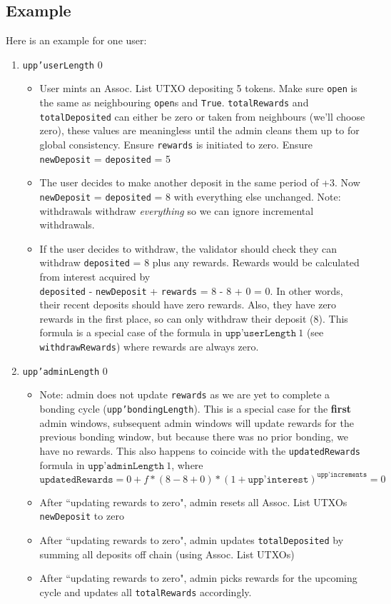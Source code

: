 \documentclass[10pt, a4paper]{article}
\theoremstyle{definition}
\begin{document}
\subsection{Example}\label{subsection:Example}
Here is an example for one user:
\begin{enumerate}
\item{\texttt{upp'userLength} 0
\begin{itemize}
\item{User mints an Assoc. List UTXO depositing 5 tokens. Make sure \texttt{open} is the same as neighbouring \texttt{open}s and \texttt{True}. \texttt{totalRewards} and \texttt{totalDeposited} can either be zero or taken from neighbours (we'll choose zero), these values are meaningless until the admin cleans them up to for global consistency. Ensure \texttt{rewards} is initiated to zero. Ensure \texttt{newDeposit} = \texttt{deposited} = 5}
\item{The user decides to make another deposit in the same period of +3. Now \texttt{newDeposit} = \texttt{deposited} = 8 with everything else unchanged. Note: withdrawals withdraw \textit{everything} so we can ignore incremental withdrawals.}
\item{If the user decides to withdraw, the validator should check they can withdraw \texttt{deposited} = 8 plus any rewards.  Rewards would be calculated from interest acquired by \\ \texttt{deposited} - \texttt{newDeposit} + \texttt{rewards} = 8 - 8 + 0 = 0. In other words, their recent deposits should have zero rewards. Also, they have zero rewards in the first place, so can only withdraw their deposit (8). This formula is a special case of the formula in $\texttt{upp'userLength}\ 1$ (see \texttt{withdrawRewards}) where rewards are always zero.}
\end{itemize}
}


\item{\texttt{upp'adminLength} 0
\begin{itemize}
\item{Note: admin does not update \texttt{rewards} as we are yet to complete a bonding cycle (\texttt{upp'bondingLength}). This is a special case for the \textbf{first} admin windows, subsequent admin windows will update rewards for the previous bonding window, but because there was no prior bonding, we have no rewards. This also happens to coincide with the \texttt{updatedRewards} formula in $\texttt{upp'adminLength}\ 1$, where $\texttt{updatedRewards} = 0 + f * (8 - 8 + 0) * (1+\texttt{upp'interest})^\texttt{upp'increments} = 0$}
\item{After ``updating rewards to zero", admin resets  all Assoc. List UTXOs \texttt{newDeposit} to zero}
\item{After ``updating rewards to zero", admin updates \texttt{totalDeposited} by summing all deposits off chain (using Assoc. List UTXOs)}
\item{After ``updating rewards to zero", admin picks rewards for the upcoming cycle and updates all \texttt{totalRewards} accordingly.}


\end{itemize}}
\end{enumerate}
\end{document}
